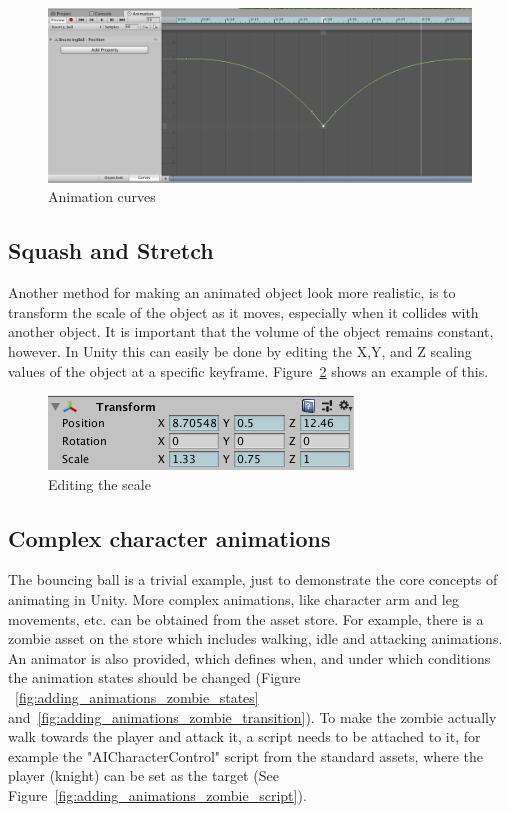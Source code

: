 \documentclass[12pt, a4paper, titlepage]{article}
\begin{document}
\begin{figure}[htbp]
  \centering
  \includegraphics[width=.4\textwidth]{pictures/animation_curves}
  \caption{Animation curves}
  \label{fig:adding_animations_curves}
\end{figure}

\subsection{Squash and Stretch}

Another method for making an animated object look more realistic, is to transform the scale of the object as it moves, especially when it collides with another object. It is important that the volume of the object remains constant, however. In Unity this can easily be done by editing the X,Y, and Z scaling values of the object at a specific keyframe. Figure~\ref{fig:adding_animations_scaling} shows an example of this.

\begin{figure}[htbp]
  \centering
  \includegraphics[width=.4\textwidth]{pictures/animation_scale}
  \caption{Editing the scale}
  \label{fig:adding_animations_scaling}
\end{figure}

\subsection{Complex character animations}

The bouncing ball is a trivial example, just to demonstrate the core concepts of animating in Unity. More complex animations, like character arm and leg movements, etc. can be obtained from the asset store. For example, there is a zombie asset on the store which includes walking, idle and attacking animations. An animator is also provided, which defines when, and under which conditions the animation states should be changed (Figure ~\ref{fig:adding_animations_zombie_states} and~\ref{fig:adding_animations_zombie_transition}).  To make the zombie actually walk towards the player and attack it, a script needs to be attached to it, for example the "AICharacterControl" script from the standard assets, where the player (knight) can be set as the target (See Figure~\ref{fig:adding_animations_zombie_script}).
\end{document}

